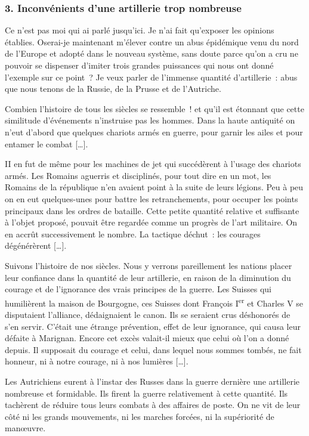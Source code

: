 \documentclass[french,twoside]{book} %
\begin{document}
\subsubsection[{3. Inconvénients d’une artillerie trop nombreuse}]{3. Inconvénients d’une artillerie trop nombreuse}
\noindent Ce n’est pas moi qui ai parlé jusqu’ici. Je n’ai fait qu’exposer les opinions établies. Oserai-je maintenant m’élever contre un abus épidémique venu du nord de l’Europe et adopté dans le nouveau système, sans doute parce qu’on a cru ne pouvoir se dispenser d’imiter trois grandes puissances qui nous ont donné l’exemple sur ce point ? Je veux parler de l’immense quantité d’artillerie : abus que nous tenons de la Russie, de la Prusse et de l’Autriche.\par
Combien l’histoire de tous les siècles se ressemble ! et qu’il est étonnant que cette similitude d’événements n’instruise pas les hommes. Dans la haute antiquité on n’eut d’abord que quelques chariots armés en guerre, pour garnir les ailes et pour entamer le combat […].\par
II en fut de même pour les machines de jet qui succédèrent à l’usage des chariots armés. Les Romains aguerris et disciplinés, pour tout dire en un mot, les Romains de la république n’en avaient point à la suite de leurs légions. Peu à peu on en eut quelques-unes pour battre les retranchements, pour occuper les points principaux dans les ordres de bataille. Cette petite quantité relative et suffisante à l’objet proposé, pouvait être regardée comme un progrès de l’art militaire. On en accrût successivement le nombre. La tactique déchut : les courages dégénérèrent […].\par
Suivons l’histoire de nos siècles. Nous y verrons pareillement les nations placer leur confiance dans la quantité de leur artillerie, en raison de la diminution du courage et de l’ignorance des vrais principes de la guerre. Les Suisses qui humilièrent la maison de Bourgogne, ces Suisses dont François I\textsuperscript{er} et Charles V se disputaient l’alliance, dédaignaient le canon. Ils se seraient crus déshonorés de s’en servir. C’était une étrange prévention, effet de leur ignorance, qui causa leur défaite à Marignan. Encore cet excès valait-il mieux que celui où l’on a donné depuis. Il supposait du courage et celui, dans lequel nous sommes tombés, ne fait honneur, ni à notre courage, ni à nos lumières […].\par
Les Autrichiens eurent à l’instar des Russes dans la guerre dernière une artillerie nombreuse et formidable. Ils firent la guerre relativement à cette quantité. Ils tachèrent de réduire tous leurs combats à des affaires de poste. On ne vit de leur côté ni les grands mouvements, ni les marches forcées, ni la supériorité de manœuvre.\par
\end{document}

